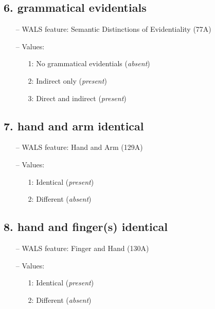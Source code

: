 \subsection*{6. grammatical evidentials}

\begin{itemize}
  \item[--] WALS feature: Semantic Distinctions of Evidentiality (77A)
  \item[--] Values:
  {\small
  \begin{enumerate}
    \item[1:] No grammatical evidentials (\emph{absent})
    \item[2:] Indirect only (\emph{present})
    \item[3:] Direct and indirect (\emph{present})
  \end{enumerate}
  }
\end{itemize}


\subsection*{7. hand and arm identical}

\begin{itemize}
  \item[--] WALS feature: Hand and Arm (129A)
  \item[--] Values:
  {\small
  \begin{enumerate}
    \item[1:] Identical (\emph{present})
    \item[2:] Different (\emph{absent})
  \end{enumerate}
  }
\end{itemize}


\subsection*{8. hand and finger(s) identical}

\begin{itemize}
  \item[--] WALS feature: Finger and Hand (130A)
  \item[--] Values:
  {\small
  \begin{enumerate}
    \item[1:] Identical (\emph{present})
    \item[2:] Different (\emph{absent})
  \end{enumerate}
  }
\end{itemize}



